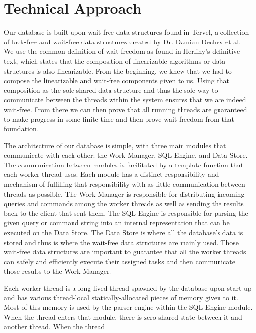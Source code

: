 \documentclass[letter,11pt]{article}
\begin{document}
\section{Technical Approach}
Our database is built upon wait-free data structures found in Tervel, a collection of
lock-free and wait-free data structures created by Dr. Damian Dechev et al\cite{web:tervel}. We use
the common definition of wait-freedom as found in Herlihy's definitive text\cite{herlihy:waitfree}, which
states that the composition of linearizable algorithms or data structures
is also linearizable. From the beginning, we knew that we had to compose 
the linearizable and wait-free components given to us. Using that composition 
as the sole shared data structure and thus the sole way to communicate 
between the threads within the system ensures that we are indeed wait-free.
From there we can then prove that all running threads are guaranteed 
to make progress in some finite time and then prove wait-freedom from that foundation.
\par\vspace{\baselineskip}
The architecture of our database is simple, with three main modules that 
communicate with each other: the Work Manager, SQL Engine, and Data Store. The communication
between modules is facilitated by a template function that each worker thread uses.
Each module has a distinct responsibility and mechanism of fulfilling that responsibility with as 
little communication between threads as possible. The Work Manager is responsible for distributing
incoming queries and commands among the worker threads as well as sending the results back to the 
client that sent them. The SQL Engine is responsible for parsing the
given query or command string into an internal representation that can be executed on the Data Store.
The Data Store is where all the database's data is stored and thus is where the wait-free data
structures are mainly used. Those wait-free data structures are important to guarantee that all
the worker threads can safely and efficiently execute their assigned tasks and then communicate
those results to the Work Manager.
\par\vspace{\baselineskip}
Each worker thread is a long-lived thread spawned by the database upon start-up and has various
thread-local statically-allocated pieces of memory given to it.
Most of this memory is used by the parser engine within the SQL Engine module. When the 
thread enters that module, there is zero shared state between it and another thread. When the thread
\end{document}
